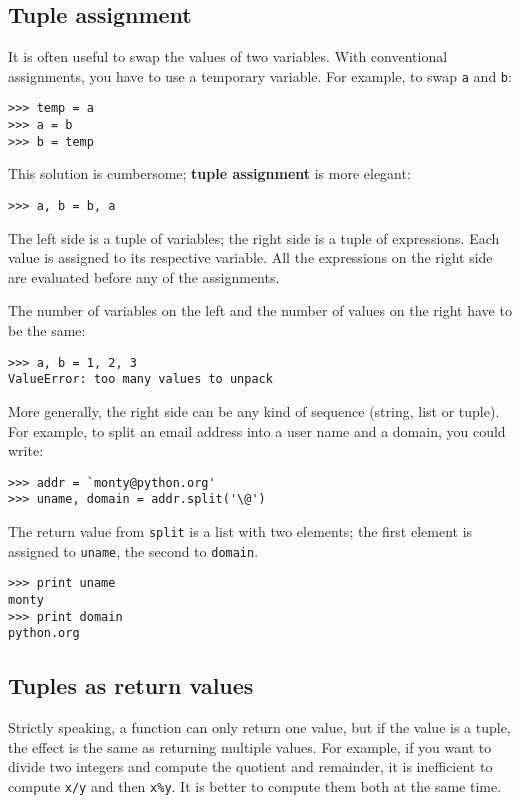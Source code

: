 \documentclass{article}
\begin{document}
\subsection{Tuple assignment}
It is often useful to swap the values of two variables. With conventional
assignments, you have to use a temporary variable.
For example, to swap \verb|a| and \verb|b|:
\begin{verbatim}
>>> temp = a
>>> a = b
>>> b = temp
\end{verbatim}
This solution is cumbersome; \textbf{tuple assignment} is more elegant:
\begin{verbatim}
>>> a, b = b, a
\end{verbatim}
The left side is a tuple of variables; the right side is a tuple of
expressions. Each value is assigned to its respective variable. All the
expressions on the right side are evaluated before any of the assignments.

The number of variables on the left and the number of values on the
right have to be the same:
\begin{verbatim}
>>> a, b = 1, 2, 3
ValueError: too many values to unpack
\end{verbatim}
More generally, the right side can be any kind of sequence (string,
list or tuple). For example, to split an email address into a user
name and a domain, you could write:
\begin{verbatim}
>>> addr = `monty@python.org'
>>> uname, domain = addr.split('\@')
\end{verbatim}
The return value from \verb|split| is a list with two elements;
the first element is assigned to \verb|uname|, the second to
\verb|domain|.
\begin{verbatim}
>>> print uname
monty
>>> print domain
python.org
\end{verbatim}

\subsection{Tuples as return values}
Strictly speaking, a function can only return one value, but if the
value is a tuple, the effect is the same as returning multiple values.
For example, if you want to divide two integers and compute the
quotient and remainder, it is inefficient to compute \verb|x/y|
and then \verb|x%y|.
It is better to compute them both at the same time.
\end{document}
